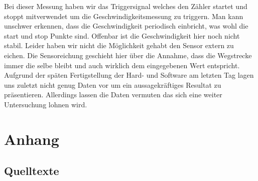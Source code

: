 \documentclass[12pt]{article}
\begin{document}
Bei dieser Messung haben wir das Triggersignal welches den Zähler startet und stoppt mitverwendet um die Geschwindigkeitsmessung zu triggern.
Man kann unschwer erkennen, dass die Geschwindigkeit periodisch einbricht, was wohl die start und stop Punkte sind. Offenbar ist die Geschwindigkeit hier noch nicht stabil. Leider haben wir nicht die Möglichkeit gehabt den Sensor extern zu eichen. Die Sensoreichung geschieht hier über die Annahme, dass
die Wegstrecke immer die selbe bleibt und auch wirklich dem eingegebenen Wert entspricht. Aufgrund der späten Fertigstellung der Hard- und Software am letzten Tag lagen uns
zuletzt nicht genug Daten vor um ein aussagekräftiges Resultat zu präsentieren. Allerdings lassen die Daten vermuten das sich eine weiter Untersuchung lohnen wird.


\section{Anhang}

\subsection{Quelltexte}






\end{document}
